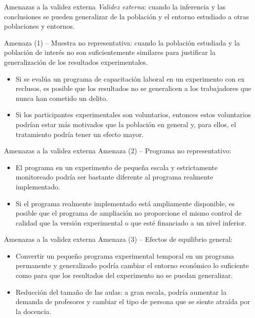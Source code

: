 \documentclass[11pt, aspectratio=169, compress]{beamer}
\begin{document}
\begin{frame}{Amenazas a la validez externa}
	\textit{Validez externa}: cuando la inferencia y las conclusiones se pueden generalizar de la población y el entorno estudiado a otras poblaciones y entornos.
	
	Amenaza (1) -- Muestra no representativa: cuando la población estudiada y la población de interés no son suficientemente similares para justificar la generalización de los resultados experimentales.
	
	\begin{itemize}
		\item Si se evalúa un programa de capacitación laboral en un experimento con ex reclusos, es posible que los resultados no se generalicen a los trabajadores que nunca han cometido un delito.
		\item Si los participantes experimentales son voluntarios, entonces estos voluntarios podrían estar más motivados que la población en general y, para ellos, el tratamiento podría tener un efecto mayor.
	\end{itemize}
\end{frame}
\begin{frame}{Amenazas a la validez externa}
	Amenaza (2) -- Programa no representativo:
	
	\begin{itemize}
		\item El programa en un experimento de pequeña escala y estrictamente monitoreado podría ser bastante diferente al programa realmente implementado. 
		
		\item Si el programa realmente implementado está ampliamente disponible, es posible que el programa de ampliación no proporcione el mismo control de calidad que la versión experimental o que esté financiado a un nivel inferior.
	\end{itemize}
\end{frame}
\begin{frame}{Amenazas a la validez externa}
	Amenaza (3) -- Efectos de equilibrio general:
	
	\begin{itemize}
		\item Convertir un pequeño programa experimental temporal en un programa permanente y generalizado podría cambiar el entorno económico lo suficiente como para que los resultados del experimento no se puedan generalizar.
		\item Reducción del tamaño de las aulas: a gran escala, podría aumentar la demanda de profesores y cambiar el tipo de persona que se siente atraída por la docencia.
	\end{itemize}
\end{frame}
\end{document}
